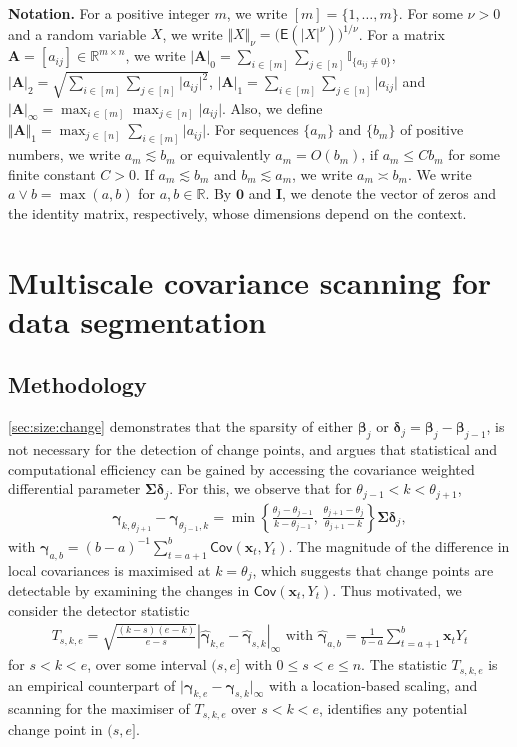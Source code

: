 \documentclass[11pt, a4paper]{article}
\newcommand{\mbf}{\mathbf}
\renewcommand{\l}{\left}
\renewcommand{\r}{\right}
\def\wh{\widehat}
\newcommand{\cp}{\theta}
\newcommand{\E}[0]{\mathsf{E}}
\newcommand{\Cov}[0]{\mathsf{Cov}}
\newcommand{\R}{\mathbb{R}}
\theoremstyle{definition}
\theoremstyle{definition}
\theoremstyle{definition}
\theoremstyle{definition}
\theoremstyle{definition}
\theoremstyle{remark}
\theoremstyle{definition}
\theoremstyle{definition}
\theoremstyle{definition}
\begin{document}
\smallskip
\textbf{Notation.}
For a positive integer $m$, we write $[m] = \{1, \ldots, m\}$. 
For some $\nu > 0$ and a random variable $X$, we write $\Vert X \Vert_\nu = \bigl(\E(\vert X \vert^\nu)\bigr)^{1/\nu}$.
For a matrix $\mbf A = [a_{ij}] \in \R^{m \times n}$, we write $\vert \mbf A \vert_0 = \sum_{i \in [m]} \sum_{j \in [n]} \mathbb{I}_{\{a_{ij} \ne 0\}}$, $\vert \mbf A \vert_2 = \sqrt{ \sum_{i \in [m]} \sum_{j \in [n]} \vert a_{ij} \vert^2}$, $\vert \mbf A \vert_1 = \sum_{i \in [m]} \sum_{j \in [n]} \vert a_{ij} \vert$ and $\vert \mbf A \vert_\infty = \max_{i \in [m]} \max_{j \in [n]} \vert a_{ij} \vert$. Also, we define $\Vert \mbf A \Vert_1 = \max_{j \in [n]} \sum_{i \in [m]} \vert a_{ij} \vert$.  
For sequences $\{a_m\}$ and $\{b_m\}$ of positive numbers, we write $a_m \lesssim b_m$ or equivalently $a_m = O(b_m)$, if $a_m \le C b_m$ for some finite constant $C > 0$. If $a_m \lesssim b_m$ and $b_m \lesssim a_m$, we write $a_m \asymp b_m$. We write $a \vee b = \max(a, b)$ for $a, b \in \R$.
By $\mbf 0$ and $\mbf I$, we denote the vector of zeros and the identity matrix, respectively, whose dimensions depend on the context.

\section{Multiscale covariance scanning for data segmentation}
\label{sec:cp}
\subsection{Methodology}
\label{sec:not}

\cref{sec:size:change} demonstrates that the sparsity of either $\bm\beta_j$ or $\bm\delta_j = \bm\beta_j - \bm\beta_{j - 1}$, is not necessary for the detection of change points, and argues that statistical and computational efficiency can be gained by accessing the covariance weighted differential parameter $\bm\Sigma \bm\delta_j$. 
For this, we observe that for $\cp_{j-1} < k < \cp_{j+1}$,
\begin{align}
\label{eq:cov:diff}
\bm\gamma_{k, \cp_{j + 1}} - \bm\gamma_{\cp_{j - 1}, k} = \min\l\{\frac{\cp_{j}-\cp_{j-1}}{k - \cp_{j-1}},\,\frac{\cp_{j+1} - \cp_{j}}{\cp_{j+1} - k}\r\}\bm\Sigma \bm\delta_j,
\end{align}
with $\bm\gamma_{a, b} = (b - a)^{- 1} \sum_{t = a + 1}^b \Cov(\mbf x_t, Y_t)$.
The magnitude of the difference in local covariances is maximised at $k = \cp_j$, which suggests that change points are detectable by examining the changes in $\Cov(\mbf x_t, Y_t)$. Thus motivated, we consider the detector statistic
\begin{align}
\label{eq:detector}
T_{s, k, e} = \sqrt{\frac{(k - s)(e - k)}{e - s}} \l\vert \wh{\bm\gamma}_{k, e} - \wh{\bm\gamma}_{s, k} \r\vert_\infty \text{ \ with \ } \wh{\bm\gamma}_{a, b} = \frac{1}{b - a} \sum_{t = a + 1}^b \mbf x_t Y_t
\end{align}
for $s < k < e$, over some interval $(s, e]$ with $0 \le s < e \le n$.
The statistic $T_{s, k, e}$ is an empirical counterpart of $\vert\bm\gamma_{k, e} - \bm\gamma_{s, k}\vert_{\infty}$ with a location-based scaling, and scanning for the maximiser of $T_{s, k, e}$ over $s < k < e$, identifies any potential change point in $(s, e]$.
\end{document}
